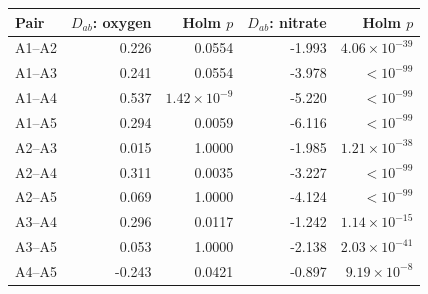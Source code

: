 \begin{tabular}{lrrrr}
\toprule
Pair & $D_{ab}$: oxygen & Holm $p$ & $D_{ab}$: nitrate & Holm $p$ \\
\midrule
A1--A2 & 0.226 & 0.0554 & -1.993 & $4.06\times10^{-39}$ \\
A1--A3 & 0.241 & 0.0554 & -3.978 & $<10^{-99}$ \\
A1--A4 & 0.537 & $1.42\times10^{-9}$ & -5.220 & $<10^{-99}$ \\
A1--A5 & 0.294 & 0.0059 & -6.116 & $<10^{-99}$ \\
A2--A3 & 0.015 & 1.0000 & -1.985 & $1.21\times10^{-38}$ \\
A2--A4 & 0.311 & 0.0035 & -3.227 & $<10^{-99}$ \\
A2--A5 & 0.069 & 1.0000 & -4.124 & $<10^{-99}$ \\
A3--A4 & 0.296 & 0.0117 & -1.242 & $1.14\times10^{-15}$ \\
A3--A5 & 0.053 & 1.0000 & -2.138 & $2.03\times10^{-41}$ \\
A4--A5 & -0.243 & 0.0421 & -0.897 & $9.19\times10^{-8}$ \\
\bottomrule
\end{tabular}
